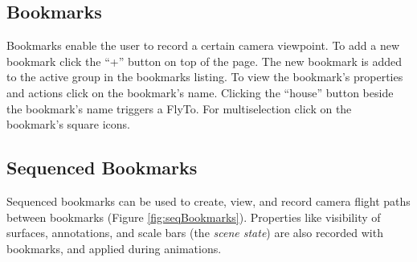 
\subsection{Bookmarks}
\label{sec:bookmarks}

	
Bookmarks enable the user to record a certain camera viewpoint.
To add a new bookmark click the ``+'' button on top of the page. The new bookmark is added to the active group in the bookmarks listing.
To view the bookmark's properties and actions click on the bookmark's name. Clicking the ``house'' button beside the bookmark's name triggers a FlyTo. For multiselection click on the bookmark's square icons.

\subsection{Sequenced Bookmarks}
\label{sec:sequenced_bookmarks}

Sequenced bookmarks can be used to create, view, and record camera flight paths between bookmarks (Figure \ref{fig:seqBookmarks}). Properties like visibility of surfaces, annotations, and scale bars (the \emph{scene state}) are also recorded with bookmarks, and applied during animations.

